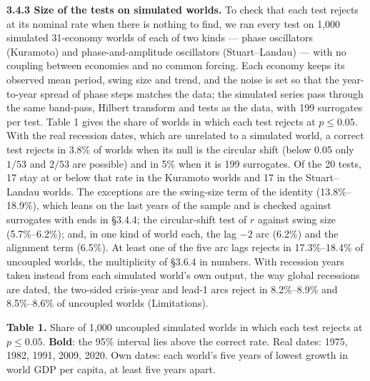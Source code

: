 \documentclass[11pt,a4paper]{article}
\begin{document}
\textbf{3.4.3 Size of the tests on simulated worlds.} To check that each test rejects at its nominal rate when there is nothing to find, we ran every test on 1,000 simulated 31-economy worlds of each of two kinds — phase oscillators (Kuramoto) and phase-and-amplitude oscillators (Stuart–Landau) — with no coupling between economies and no common forcing. Each economy keeps its observed mean period, swing size and trend, and the noise is set so that the year-to-year spread of phase steps matches the data; the simulated series pass through the same band-pass, Hilbert transform and tests as the data, with 199 surrogates per test. Table 1 gives the share of worlds in which each test rejects at \(p \le 0.05\). With the real recession dates, which are unrelated to a simulated world, a correct test rejects in 3.8\% of worlds when its null is the circular shift (below 0.05 only \(1/53\) and \(2/53\) are possible) and in 5\% when it is 199 surrogates. Of the 20 tests, 17 stay at or below that rate in the Kuramoto worlds and 17 in the Stuart–Landau worlds. The exceptions are the swing-size term of the identity (13.8\%–18.9\%), which leans on the last years of the sample and is checked against surrogates with ends in §3.4.4; the circular-shift test of \(r\) against swing size (5.7\%–6.2\%); and, in one kind of world each, the lag \(-2\) arc (6.2\%) and the alignment term (6.5\%). At least one of the five arc lags rejects in 17.3\%–18.4\% of uncoupled worlds, the multiplicity of §3.6.4 in numbers. With recession years taken instead from each simulated world's own output, the way global recessions are dated, the two-sided crisis-year and lead-1 arcs reject in 8.2\%–8.9\% and 8.5\%–8.6\% of uncoupled worlds (Limitations).

\textbf{Table 1.} Share of 1,000 uncoupled simulated worlds in which each test rejects at \(p \le 0.05\). \textbf{Bold}: the 95\% interval lies above the correct rate. Real dates: 1975, 1982, 1991, 2009, 2020. Own dates: each world's five years of lowest growth in world GDP per capita, at least five years apart.
\end{document}
